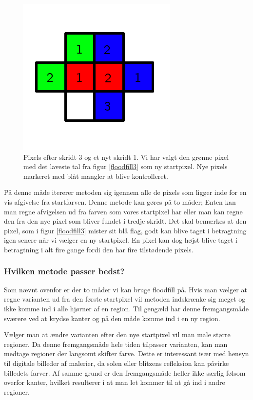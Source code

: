 {\begin{figure}[!h]
    \begin{center}
        \includegraphics[scale=0.42,angle=0]{afsnit/vores_implementation/billeder/flood_fill/floodfill4}
    \end{center}
    \caption[]{Pixels efter skridt 3 og et nyt skridt 1. Vi har valgt
    den grønne pixel med det laveste tal fra figur \ref{floodfill3} som
    ny startpixel. Nye pixels markeret med blåt mangler at blive
    kontrolleret.}
    \label{floodfill4}
\end{figure}

På denne måde itererer metoden sig igennem alle de pixels som ligger
inde for en vis afgivelse fra startfarven. Denne metode kan gøres på to
måder; Enten kan man regne afvigelsen ud fra farven som vores startpixel
har eller man kan regne den fra den nye pixel som bliver fundet i tredje
skridt. Det skal bemærkes at den pixel, som i figur \ref{floodfill3}
mister sit blå flag, godt kan blive taget i betragtning igen senere når
vi vælger en ny startpixel. En pixel kan dog højst blive taget i
betragtning i alt fire gange fordi den har fire tilstødende pixels.

\subsubsection{Hvilken metode passer bedst?}
Som nævnt ovenfor er der to måder vi kan bruge floodfill på. Hvis man
vælger at regne varianten ud fra den første startpixel vil metoden
indskrænke sig meget og ikke komme ind i alle hjørner af en region. Til
gengæld har denne fremgangsmåde sværere ved at krydse kanter og på den
måde komme ind i en ny region.

Vælger man at ændre varianten efter den nye startpixel vil man male
større regioner. Da denne fremgangsmåde hele tiden tilpasser varianten,
kan man medtage regioner der langsomt skifter farve. Dette er
interessant især med hensyn til digitale billeder af malerier, da solen
eller blitzens refleksion kan påvirke billedets farver. Af samme grund er
den fremgangsmåde heller ikke særlig følsom overfor kanter, hvilket
resulterer i at man let kommer til at gå ind i andre regioner.

}
